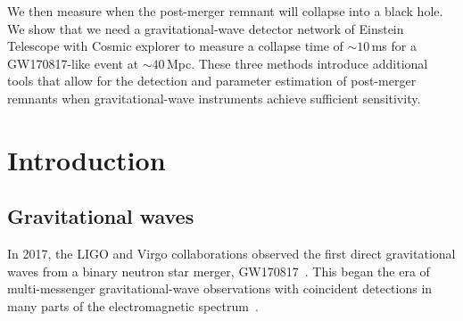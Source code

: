 \documentclass[../Thesis.tex]{subfiles}
\begin{document}
    We  then measure when the post-merger remnant will collapse into a black hole.
    We show that we need a gravitational-wave detector network of Einstein Telescope with Cosmic explorer to measure a collapse time of $\sim\!10$\,ms for a GW170817-like event at $\sim\!40$\,Mpc.
    These three methods introduce additional tools that allow for the detection and parameter estimation of post-merger remnants when gravitational-wave instruments achieve sufficient sensitivity.
    
    
\begingroup
\clearpage%
\let\clearpage\relax%
\vspace*{-2cm}%



\chapter{Introduction} \label{chapter:Introduction}
\endgroup 

    
    
    

    \section{Gravitational waves} 
    In 2017, the LIGO and Virgo collaborations observed the first direct gravitational waves from a binary neutron star merger, GW170817~\cite{GW170817Detection}.
    This began the era of multi-messenger gravitational-wave observations with coincident detections in many parts of the electromagnetic spectrum~\cite{Goldstein2017,Coulter2017,Troja2017,Nicholl2017,Chornock2017,Margutti2017,Alexander2017,GW170817multi}. \par
    
\end{document}
